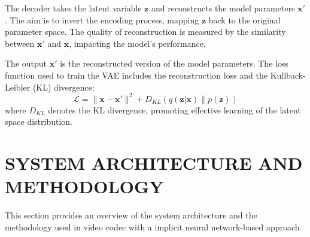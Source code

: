 \documentclass{ioereport}
\begin{document}
    The decoder takes the latent variable $\mathbf{z}$ and reconstructs the model parameters $\mathbf{x'}$. The aim is to invert the encoding process, mapping $\mathbf{z}$ back to the original parameter space. The quality of reconstruction is measured by the similarity between $\mathbf{x'}$ and $\mathbf{x}$, impacting the model's performance.

    The output $\mathbf{x'}$ is the reconstructed version of the model parameters. The loss function used to train the VAE includes the reconstruction loss and the Kullback-Leibler (KL) divergence:
    \begin{equation}
    \mathcal{L} = \|\mathbf{x} - \mathbf{x'}\|^2 + D_{KL}(q(\mathbf{z}|\mathbf{x}) \| p(\mathbf{z}))
    \end{equation}
    where $D_{KL}$ denotes the KL divergence, promoting effective learning of the latent space distribution.

\pagebreak

\section{\MakeUppercase{System Architecture and Methodology}}   
This section provides an overview of the system architecture and the methodology used in video \gls{codec} with a implicit neural network-based approach.
\end{document}
